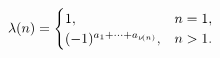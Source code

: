 \[\mathop{\lambda\/}\nolimits\!\left(n\right)=\begin{cases}1,&n=1,\\
(-1)^{a_{1}+\dots+a_{\mathop{\nu\/}\nolimits\!\left(n\right)}},&n>1.\end{cases}\]